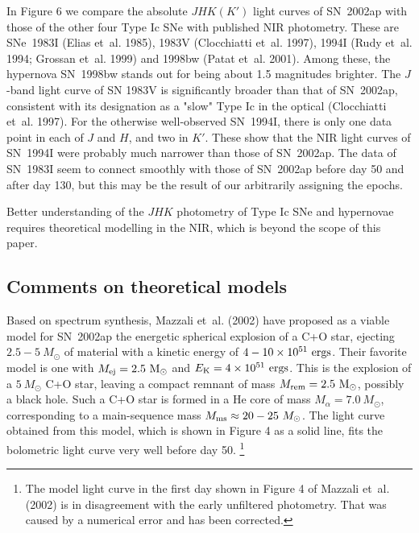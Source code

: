 \documentclass[10pt,preprint2]{aastex}
\def\sun{\odot}
\begin{document}
In Figure 6 we compare the absolute $JHK(K')$ light curves of
SN~2002ap with those of the other four Type Ic SNe with published
NIR photometry. These are SNe~1983I (Elias et~al. 1985), 1983V
(Clocchiatti et~al. 1997), 1994I (Rudy et~al. 1994; Grossan et~al.
1999) and 1998bw (Patat et~al. 2001). Among these, the hypernova
SN~1998bw stands out for being about 1.5 magnitudes brighter. The
$J$-band light curve of SN 1983V is significantly broader than
that of SN~2002ap, consistent with its designation as a "slow"
Type Ic in the optical (Clocchiatti et~al. 1997). For the
otherwise well-observed SN~1994I, there is only one data point in
each of $J$ and $H$, and two in $K'$. These show that the NIR
light curves of SN~1994I were probably much narrower than those of
SN~2002ap. The data of SN~1983I seem to connect smoothly with
those of SN~2002ap before day 50 and after day 130, but this may
be the result of our arbitrarily assigning the epochs.

Better understanding of the $JHK$ photometry of Type Ic SNe
and hypernovae requires theoretical modelling in the NIR,
which is beyond the scope of this paper.


\subsection{Comments on theoretical models}

Based on spectrum synthesis, Mazzali et~al. (2002) have proposed
as a viable model for SN~2002ap the energetic spherical explosion
of a C+O star, ejecting $2.5-5~{M_\sun}$ of material with a
kinetic energy of $4-10\times 10^{51}~{\rm ergs}$. Their favorite
model is one with $M_{\rm ej}=2.5~{\rm M_\sun}$ and $E_{\rm
K}=4\times 10^{51}~{\rm ergs}$. This is the explosion of a
$5~{M_\sun}$ C+O star, leaving a compact remnant of mass $M_{\rm
rem}=2.5~{\rm M_\sun}$, possibly a black hole. Such a C+O
star is formed in a He core of mass $M_\alpha=7.0~M_\sun$,
corresponding to a main-sequence mass $M_{\rm ms}\approx
20-25~M_\sun$. The light curve obtained from this model, which is
shown in Figure 4 as a solid line, fits the bolometric light curve
very well before day 50. \footnote{The model light curve in the
first day shown in Figure 4 of Mazzali et~al. (2002) is in
disagreement with the early unfiltered photometry.
That was caused by a numerical error and has been corrected.}
\end{document}
